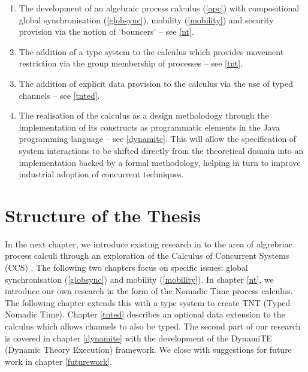 \begin{enumerate}
\item The development of an algebraic process calculus (\ref{apc})
  with compositional global synchronisation (\ref{globsync}), mobility
  (\ref{mobility}) and security provision via the notion of `bouncers'
  -- see \ref{nt}.
\item The addition of a type system to the calculus which provides
  movement restriction via the group membership of processes -- see
  \ref{tnt}.
\item The addition of explicit data provision to the calculus via the
  use of typed channels -- see \ref{tnted}.
\item The realisation of the calculus as a design metholodogy through
  the implementation of its constructs as programmatic elements in the
  Java programming language -- see \ref{dynamite}.  This will allow
  the specification of system interactions to be shifted directly from
  the theoretical domain into an implementation backed by a formal
  methodology, helping in turn to improve industrial adoption of
  concurrent techniques.
\end{enumerate}

\section{Structure of the Thesis}

In the next chapter, we introduce existing research in to the area of
algrebriac process calculi through an exploration of the Calculus of
Concurrent Systems (CCS) \cite{milner:ccs}.  The following two
chapters focus on specific issues: global synchronisation
(\ref{globsync}) and mobility (\ref{mobility}).  In chapter \ref{nt},
we introduce our own research in the form of the Nomadic Time process
calculus.  The following chapter extends this with a type system to
create TNT (Typed Nomadic Time).  Chapter \ref{tnted} describes an
optional data extension to the calculus which allows channels to also
be typed.  The second part of our research is covered in chapter
\ref{dynamite} with the development of the DynamiTE (Dynamic Theory
Execution) framework.  We close with suggestions for future work in
chapter \ref{futurework}.
